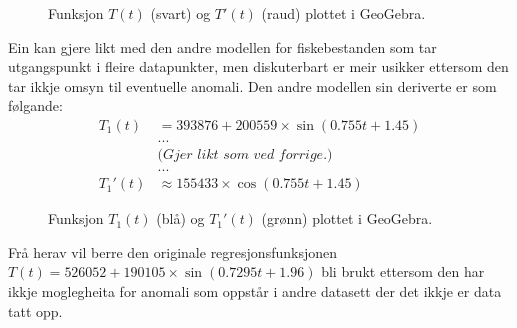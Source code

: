 \documentclass{report}
\begin{document}
\begin{figure}[H]
	\centering
	\caption{Funksjon $T(t)$ (svart) og $T'(t)$ (raud) plottet i GeoGebra.}
	\label{TOGTDER}
\end{figure}
Ein kan gjere likt med den andre modellen for fiskebestanden som tar utgangspunkt i fleire datapunkter, men diskuterbart er meir usikker ettersom den tar ikkje omsyn til eventuelle anomali.
Den andre modellen sin deriverte er som følgande:
\begin{align*}
	T_{1}(t)  & = 393876+200559\times \sin(0.755t+1.45) \\
	          & ...                                     \\
	          & \textit{(Gjer likt som ved forrige.)}   \\
	          & ...                                     \\
	T_{1}'(t) & \approx 155433 \times \cos(0.755t+1.45)
\end{align*}
\begin{figure}[H]
	\centering
	\caption{Funksjon $T_{1}(t)$ (blå) og $T_{1}'(t)$ (grønn) plottet i GeoGebra.}
	\label{F5}
\end{figure}
Frå herav vil berre den originale regresjonsfunksjonen $T(t)=526052+190105\times \sin(0.7295t+1.96)$ bli brukt ettersom den har ikkje moglegheita for anomali som oppstår i andre datasett der det ikkje er data tatt opp.
\end{document}
